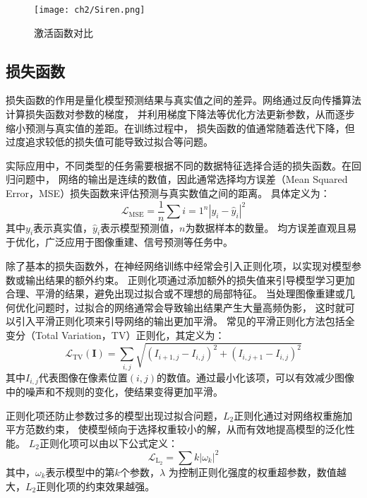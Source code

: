 \begin{figure}[htb]
  \centering
  \texttt{[image: ch2/Siren.png]}
  \caption{激活函数对比\cite{sitzmann2020implicit}}
  \label{fig:siren_compare}
\end{figure}

\subsection{损失函数}

损失函数的作用是量化模型预测结果与真实值之间的差异。网络通过反向传播算法计算损失函数对参数的梯度，
并利用梯度下降法等优化方法更新参数，从而逐步缩小预测与真实值的差距。在训练过程中，
损失函数的值通常随着迭代下降，但过度追求较低的损失值可能导致过拟合等问题。

实际应用中，不同类型的任务需要根据不同的数据特征选择合适的损失函数。在回归问题中，
网络的输出是连续的数值，因此通常选择均方误差（Mean Squared Error，MSE）损失函数来评估预测与真实数值之间的距离。
具体定义为：
\begin{equation} 
  \mathcal{L}_{\text{MSE}}=\frac{1}{n}\sum{i=1}^{n}\left|y_i - \hat{y}_i\right|^2 
\end{equation}
其中$y_i$表示真实值，$\hat{y}_i$表示模型预测值，$n$为数据样本的数量。
均方误差直观且易于优化，广泛应用于图像重建、信号预测等任务中。

除了基本的损失函数外，在神经网络训练中经常会引入正则化项，以实现对模型参数或输出结果的额外约束。
正则化项通过添加额外的损失值来引导模型学习更加合理、平滑的结果，避免出现过拟合或不理想的局部特征。
当处理图像重建或几何优化问题时，过拟合的网络通常会导致输出结果产生大量高频伪影，
这时就可以引入平滑正则化项来引导网络的输出更加平滑。
常见的平滑正则化方法包括全变分（Total Variation，TV）正则化，其定义为：
\begin{equation} 
  \mathcal{L}_{\text{TV}}(\boldsymbol{I})=\sum_{i,j}\sqrt{\left(I_{i+1,j}-I_{i,j}\right)^2+\left(I_{i,j+1}-I_{i,j}\right)^2} 
\end{equation} 
其中$I_{i,j}$代表图像在像素位置$(i,j)$的数值。通过最小化该项，可以有效减少图像中的噪声和不规则的变化，使结果变得更加平滑。

正则化项还防止参数过多的模型出现过拟合问题，$L_2$正则化通过对网络权重施加平方范数约束，
使模型倾向于选择权重较小的解，从而有效地提高模型的泛化性能。
$L_2$正则化项可以由以下公式定义：
\begin{equation}
  \mathcal{L}_{\mathrm{L_2}}=\sum{k}\left|\omega_k\right|^2 
\end{equation} 
其中，$\omega_k$表示模型中的第$k$个参数，$\lambda$ 为控制正则化强度的权重超参数，数值越大，$L_2$正则化项的约束效果越强。

